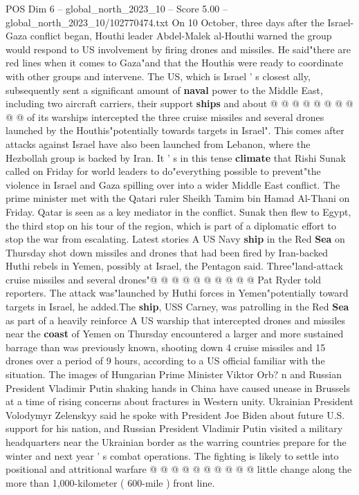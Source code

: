 \begin{textsample}{POS Dim 6 – global\_north\_2023\_10 – Score 5.00 – global\_north\_2023\_10/102770474.txt}
On 10 October, three days after the Israel-Gaza conflict began, Houthi leader Abdel-Malek al-Houthi warned the group would respond to US involvement by firing drones and missiles.
He said"there are red lines when it comes to Gaza"and that the Houthis were ready to coordinate with other groups and intervene.
The US, which is Israel ' s closest ally, subsequently sent a significant amount of \textbf{naval} power to the Middle East, including two aircraft carriers, their support \textbf{ships} and about @ @ @ @ @ @ @ @ @ @ of its warships intercepted the three cruise missiles and several drones launched by the Houthis"potentially towards targets in Israel".
This comes after attacks against Israel have also been launched from Lebanon, where the Hezbollah group is backed by Iran.
It ' s in this tense \textbf{climate} that Rishi Sunak called on Friday for world leaders to do"everything possible to prevent"the violence in Israel and Gaza spilling over into a wider Middle East conflict.
The prime minister met with the Qatari ruler Sheikh Tamim bin Hamad Al-Thani on Friday.
Qatar is seen as a key mediator in the conflict.
Sunak then flew to Egypt, the third stop on his tour of the region, which is part of a diplomatic effort to stop the war from escalating.
Latest stories A US Navy \textbf{ship} in the Red \textbf{Sea} on Thursday shot down missiles and drones that had been fired by Iran-backed Huthi rebels in Yemen, possibly at Israel, the Pentagon said.
Three"land-attack cruise missiles and several drones"@ @ @ @ @ @ @ @ @ @ Pat Ryder told reporters.
The attack was"launched by Huthi forces in Yemen"potentially toward targets in Israel, he added.The \textbf{ship}, USS Carney, was patrolling in the Red \textbf{Sea} as part of a heavily reinforce A US warship that intercepted drones and missiles near the \textbf{coast} of Yemen on Thursday encountered a larger and more sustained barrage than was previously known, shooting down 4 cruise missiles and 15 drones over a period of 9 hours, according to a US official familiar with the situation.
The images of Hungarian Prime Minister Viktor Orb? n and Russian President Vladimir Putin shaking hands in China have caused unease in Brussels at a time of rising concerns about fractures in Western unity.
Ukrainian President Volodymyr Zelenskyy said he spoke with President Joe Biden about future U.S. support for his nation, and Russian President Vladimir Putin visited a military headquarters near the Ukrainian border as the warring countries prepare for the winter and next year ' s combat operations.
The fighting is likely to settle into positional and attritional warfare @ @ @ @ @ @ @ @ @ @ little change along the more than 1,000-kilometer ( 600-mile ) front line.

\end{textsample}
